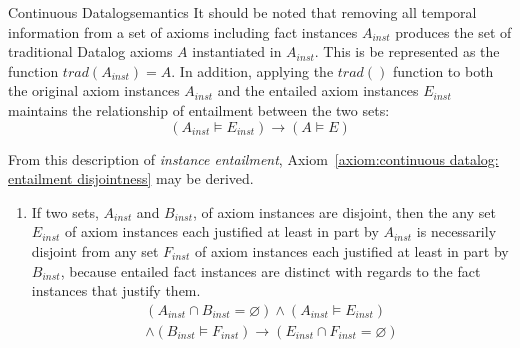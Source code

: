 \begin{nestedsection}{Continuous Datalog}{semantics}
	It should be noted that removing all temporal information from a set of axioms including fact instances $A_{inst}$ produces the set of traditional Datalog axioms $A$ instantiated in $A_{inst}$.
	This is be represented as the function ${trad\left( A_{inst} \right) = A}$.
	In addition, applying the ${trad()}$ function to both the original axiom instances $A_{inst}$ and the entailed axiom instances $E_{inst}$ maintains the relationship of entailment between the two sets:
	\[ \left( A_{inst} \vDash E_{inst} \right) \rightarrow \left( A \vDash E \right) \]

	From this description of \emph{instance entailment}, Axiom~\ref{axiom:continuous datalog: entailment disjointness} may be derived.
	\begin{enumerate}\setcounter{enumi}{\thecontinuousDatalogAxioms}
		\item\label{axiom:continuous datalog: entailment disjointness}
			If two sets, $A_{inst}$ and $B_{inst}$, of axiom instances are disjoint, then the any set $E_{inst}$ of axiom instances each justified at least in part by $A_{inst}$ is necessarily disjoint from any set $F_{inst}$ of axiom instances each justified at least in part by $B_{inst}$, because entailed fact instances are distinct with regards to the fact instances that justify them.
			\begin{multline*}
				\left( A_{inst} \cap B_{inst} = \varnothing \right) \wedge \left( A_{inst} \vDash E_{inst} \right) \\
					\wedge \left( B_{inst} \vDash F_{inst} \right) \rightarrow \left( E_{inst} \cap F_{inst} = \varnothing \right)
			\end{multline*}
		\setcounter{continuousDatalogAxioms}{\theenumi}
	\end{enumerate}


\end{nestedsection}
